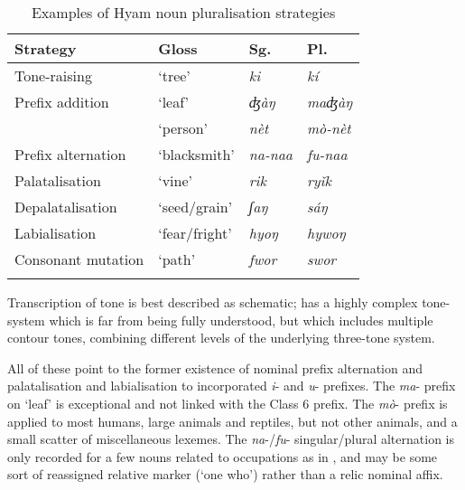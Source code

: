 \documentclass[output=paper]{langsci/langscibook}
\begin{document}
\begin{table}
\caption{\label{tab:nomaffplat:8} Examples of Hyam noun pluralisation strategies}
\begin{tabularx}{\textwidth}{XXXl}
\lsptoprule
  Strategy 	& Gloss 	& {Sg.} 	& {Pl.}\\
\midrule
Tone-raising 	& `tree' 	& \itshape ki 	& \itshape kí\\
Prefix addition 	& `leaf' 	& \itshape ʤàŋ 	& \itshape maʤàŋ\\
	& `person' 	& \itshape nèt 	& \itshape mò-nèt\\
Prefix alternation 	& `blacksmith' 	& \textit{na-naa} 	& \textit{fu-naa}\\
Palatalisation 	& `vine' 	& \itshape rik 	& \textit{ryǐk}\\
Depalatalisation 	& `seed/grain' 	& \itshape ʃaŋ 	& \textit{sáŋ}\\
Labialisation 	& `fear/fright' 	& \itshape hyoŋ 	& \textit{hywoŋ}\\
Consonant mutation 	& `path' 	& \itshape fwor 	& \textit{swor}\\
\lspbottomrule
\end{tabularx}
\end{table} 

Transcription of tone is best described as schematic;  has a highly complex tone-system which is far from being fully understood, but which includes multiple contour tones, combining different levels of the underlying three-tone system.

All of these point to the former existence of nominal prefix alternation and palatalisation and labialisation to incorporated \textit{i}- and \textit{u}- prefixes. The \textit{ma}- prefix on ‘leaf’ is exceptional and not linked with the Class 6 prefix. The \textit{mò}- prefix is applied to most humans, large animals and reptiles, but not other animals, and a small scatter of miscellaneous lexemes. The \textit{na}-/\textit{fu}- singular/plural alternation is only recorded for a few nouns related to occupations as in , and may be some sort of reassigned relative marker (‘one who’) rather than a relic nominal affix.

\end{document}
